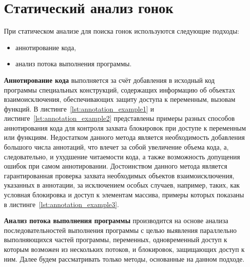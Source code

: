 \chapter{Статический анализ гонок}
\label{cha:static-methods}

При статическом анализе для поиска гонок используются следующие подходы:
\begin{itemize}
\item аннотирование кода,
\item анализ потока выполнения программы.
\end{itemize}

\textbf{Аннотирование кода} выполняется за счёт добавления в исходный код программы специальных конструкций, содержащих информацию об объектах взаимоисключения, обеспечивающих защиту доступа к переменным, вызовам функций. В листинге~\ref{lst:annotation_example1} и листинге~\ref{lst:annotation_example2} представлены примеры разных способов аннотирования кода для контроля захвата блокировок при доступе к переменным или функциям. Недостатком данного метода является необходимость добавления большого числа аннотаций, что влечет за собой увеличение объема кода, а, следовательно, и ухудшение читаемости кода, а также возможность допущения ошибок при самом аннотировании. Достоинством данного метода является гарантированная проверка захвата необходимых объектов взаимоисключения, указанных в аннотации, за исключением особых случаев, например, таких, как условная блокировка и доступ к элементам массива, примеры которых показаны в листинге~\ref{lst:annotation_example3}.







\textbf{Анализ потока выполнения программы} производится на основе анализа последовательностей выполнения программы с целью выявления параллельно выполняющихся частей программы, переменных, одновременный доступ к которым возможен из нескольких потоков, и блокировок, защищающих доступ к ним. Далее будем рассматривать только методы, основанные на данном подходе.

